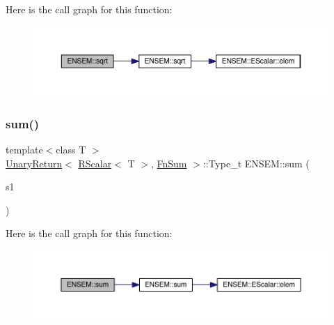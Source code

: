 Here is the call graph for this function\+:\nopagebreak
\begin{figure}[H]
\begin{center}
\leavevmode
\includegraphics[width=350pt]{d9/ded/group__rscalar_ga1f127fac0ef1cb032c7bd632657439bf_cgraph}
\end{center}
\end{figure}
\mbox{\label{group__rscalar_ga53401bdacfb693c17335cacfc5e9f6dd}} 
\subsubsection{\texorpdfstring{sum()}{sum()}}
{\footnotesize\ttfamily template$<$class T $>$ \\
\mbox{\hyperlink{structENSEM_1_1UnaryReturn}{Unary\+Return}}$<$ \mbox{\hyperlink{classENSEM_1_1RScalar}{R\+Scalar}}$<$ T $>$, \mbox{\hyperlink{structENSEM_1_1FnSum}{Fn\+Sum}} $>$\+::Type\+\_\+t E\+N\+S\+E\+M\+::sum (\begin{DoxyParamCaption}\item[{const \mbox{\hyperlink{classENSEM_1_1RScalar}{R\+Scalar}}$<$ T $>$ \&}]{s1 }\end{DoxyParamCaption})\hspace{0.3cm}{\ttfamily [inline]}}

Here is the call graph for this function\+:\nopagebreak
\begin{figure}[H]
\begin{center}
\leavevmode
\includegraphics[width=350pt]{d9/ded/group__rscalar_ga53401bdacfb693c17335cacfc5e9f6dd_cgraph}
\end{center}
\end{figure}
\mbox{\label{group__rscalar_ga84dc4a2763ad7c0adb4af839501c4c99}} 
